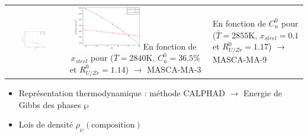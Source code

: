 \begin{frame}
\begin{columns}[T]
\begin{column}{0.6\textwidth}
\begin{tabularx}{\textwidth}{>{\setlength{\baselineskip}{0.5\baselineskip}}C >{\setlength{\baselineskip}{0.5\baselineskip}}C}
	\includegraphics[width=0.48\textwidth]{Figures/densities_vs_x0met_MA3_2840K_new.png} & \includegraphics[width=0.48\textwidth]{Figures/densities_vs_Cn_MA9_2855K_new.png} \n
	{\tiny En fonction de $x_{steel}$ pour ($\bar{T}=2840$K, $C_n^0=36.5\%$ et $R_{U/Zr}^0=1.14$) $\rightarrow$ MASCA-MA-3} & {\tiny En fonction de $C_n^0$ pour ($\bar{T}=2855$K, $x_{steel}=0.1$ et $R_{U/Zr}^0=1.17$) $\rightarrow$ MASCA-MA-9}
	\end{tabularx}
	\renewcommand{\arraystretch}{1.0}
	\baselineskip
	\begin{itemize}
	\item Représentation thermodynamique : méthode CALPHAD $\rightarrow$ Energie de Gibbs des phases $\wp$
	\item Lois de densité $\rho_{\wp}\left(\text{composition}\right)$
	\end{itemize}
	\end{column}
	\end{columns}
\end{frame}
